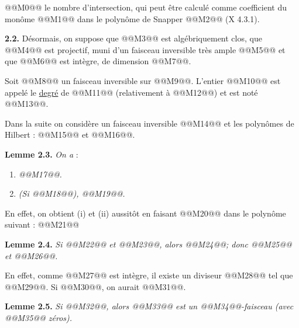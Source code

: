 
@@M0@@ le nombre d'intersection, qui peut être calculé comme coefficient du monôme @@M1@@ dans le polynôme de Snapper @@M2@@ (X 4.3.1).

\textbf{2.2.} Désormais, on suppose que @@M3@@ est algébriquement clos, que @@M4@@ est projectif, muni d'un faisceau inversible très ample @@M5@@ et que @@M6@@ est intègre, de dimension @@M7@@.

Soit @@M8@@ un faisceau inversible sur @@M9@@. L'entier @@M10@@ est appelé le \uline{degré} de @@M11@@ (relativement à @@M12@@) et est noté @@M13@@.

Dans la suite on considère un faisceau inversible @@M14@@ et les polynômes de Hilbert : @@M15@@ et @@M16@@.

\textbf{Lemme 2.3.} \emph{On a} :
\begin{enumerate}[label=(\roman*)]
\item \emph{@@M17@@.}
\item \emph{(Si @@M18@@), @@M19@@.}
\end{enumerate}

En effet, on obtient (i) et (ii) aussitôt en faisant @@M20@@ dans le polynôme suivant :
@@M21@@

\textbf{Lemme 2.4.} \emph{Si @@M22@@ et @@M23@@, alors @@M24@@; donc @@M25@@ et @@M26@@.}

En effet, comme @@M27@@ est intègre, il existe un diviseur @@M28@@ tel que @@M29@@. Si @@M30@@, on aurait @@M31@@.

\textbf{Lemme 2.5.} \emph{Si @@M32@@, alors @@M33@@ est un @@M34@@-faisceau (avec @@M35@@ zéros).}

